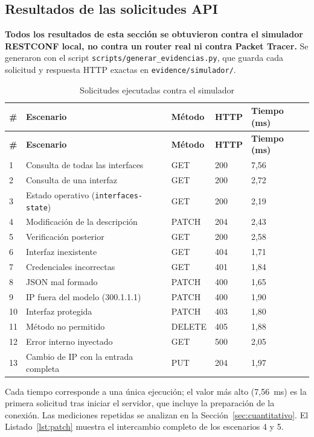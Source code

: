 \subsection{Resultados de las solicitudes API}
\textbf{Todos los resultados de esta sección se obtuvieron contra el simulador RESTCONF local, no contra un router real ni contra Packet Tracer.} Se generaron con el script \texttt{scripts/generar\_evidencias.py}, que guarda cada solicitud y respuesta HTTP exactas en \texttt{evidence/simulador/}.

\begin{longtable}{p{0.5cm}p{6.4cm}p{1.8cm}p{1.5cm}p{2.4cm}}
\caption{Solicitudes ejecutadas contra el simulador}\label{tab:api}\\
\toprule
\textbf{\#} & \textbf{Escenario} & \textbf{Método} & \textbf{HTTP} & \textbf{Tiempo (ms)} \\
\midrule
\endfirsthead
\toprule
\textbf{\#} & \textbf{Escenario} & \textbf{Método} & \textbf{HTTP} & \textbf{Tiempo (ms)} \\
\midrule
\endhead
1 & Consulta de todas las interfaces & GET & 200 & 7,56 \\
2 & Consulta de una interfaz & GET & 200 & 2,72 \\
3 & Estado operativo (\texttt{interfaces-state}) & GET & 200 & 2,19 \\
4 & Modificación de la descripción & PATCH & 204 & 2,43 \\
5 & Verificación posterior & GET & 200 & 2,58 \\
6 & Interfaz inexistente & GET & 404 & 1,71 \\
7 & Credenciales incorrectas & GET & 401 & 1,84 \\
8 & JSON mal formado & PATCH & 400 & 1,65 \\
9 & IP fuera del modelo (300.1.1.1) & PATCH & 400 & 1,90 \\
10 & Interfaz protegida & PATCH & 403 & 1,80 \\
11 & Método no permitido & DELETE & 405 & 1,88 \\
12 & Error interno inyectado & GET & 500 & 2,05 \\
13 & Cambio de IP con la entrada completa & PUT & 204 & 1,97 \\
\bottomrule
\end{longtable}

Cada tiempo corresponde a una única ejecución; el valor más alto (7,56~ms) es la primera solicitud tras iniciar el servidor, que incluye la preparación de la conexión. Las mediciones repetidas se analizan en la Sección~\ref{sec:cuantitativo}. El Listado~\ref{lst:patch} muestra el intercambio completo de los escenarios 4 y 5.

